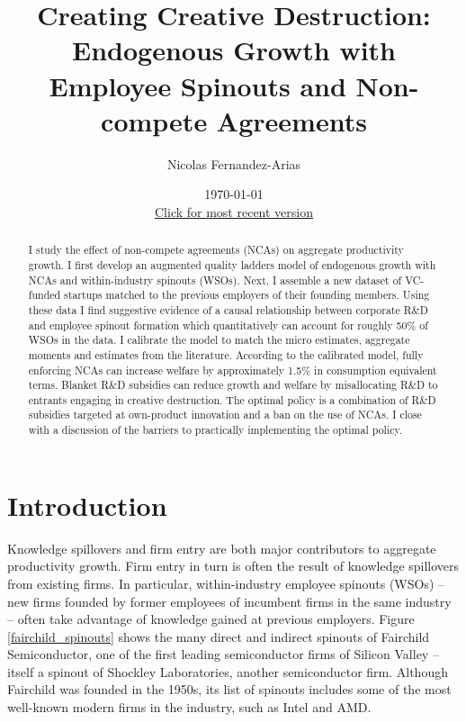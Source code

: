 \documentclass[11pt,english]{article}
\begin{document}
	
\title{Creating Creative Destruction: Endogenous Growth with Employee Spinouts and Non-compete Agreements}

\author{Nicolas Fernandez-Arias} 
\date{\today \\ \small
	\href{https://drive.google.com/file/d/1v_ohHi0CpIoqz2LQTNEJYDz5qmpSZTSi/view?usp=sharing}{Click for most recent version}}
\maketitle



\begin{abstract}
	I study the effect of non-compete agreements (NCAs) on aggregate productivity growth. I first develop an augmented quality ladders model of endogenous growth with NCAs and within-industry spinouts (WSOs). Next, I assemble a new dataset of VC-funded startups matched to the previous employers of their founding members. Using these data I find suggestive evidence of a causal relationship between corporate R\&D and employee spinout formation which quantitatively can account for roughly 50\% of WSOs in the data. I calibrate the model to match the micro estimates, aggregate moments and estimates from the literature. According to the calibrated model, fully enforcing NCAs can increase welfare by approximately 1.5\% in consumption equivalent terms. Blanket R\&D subsidies can reduce growth and welfare by misallocating R\&D to entrants engaging in creative destruction. The optimal policy is a combination of R\&D subsidies targeted at own-product innovation and a ban on the use of NCAs. I close with a discussion of the barriers to practically implementing the optimal policy.
\end{abstract}

\section{Introduction}

Knowledge spillovers and firm entry are both major contributors to aggregate productivity growth. Firm entry in turn is often the result of knowledge spillovers from existing firms. In particular, within-industry employee spinouts (WSOs) -- new firms founded by former employees of incumbent firms in the same industry -- often take advantage of knowledge gained at previous employers. Figure \ref{fairchild_spinouts} shows the many direct and indirect spinouts of Fairchild Semiconductor, one of the first leading semiconductor firms of Silicon Valley -- itself a spinout of Shockley Laboratories, another semiconductor firm. Although Fairchild was founded in the 1950s, its list of spinouts includes some of the most well-known modern firms in the industry, such as Intel and AMD. 
\end{document}
